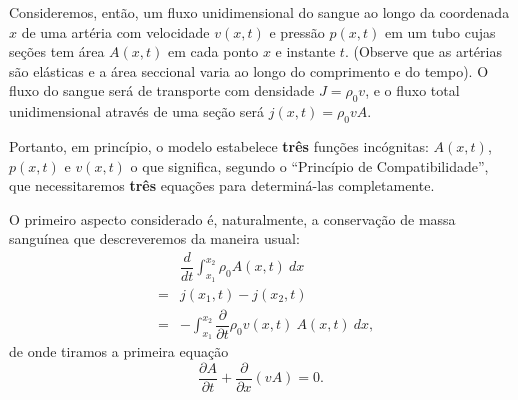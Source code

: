 Consideremos, então, um fluxo unidimensional do sangue ao longo da coordenada \(x\) de uma artéria com velocidade \(v(x,t)\) e pressão \(p(x,t)\) em um tubo cujas seções tem área \(A(x,t)\) em cada ponto \(x\) e instante \(t\). (Observe que as artérias são elásticas e a área seccional varia ao longo do comprimento e do tempo). O fluxo do sangue será de transporte com densidade \(J = \rho_0v\), e o fluxo total unidimensional através de uma seção será \(j(x,t) = \rho_0 v A\).

Portanto, em princípio, o modelo estabelece \textbf{três} funções incógnitas: \(A(x,t)\), \(p(x,t)\) e \(v(x,t)\) o que significa, segundo o ``Princípio de Compatibilidade'', que necessitaremos \textbf{três} equações para determiná-las completamente.

O primeiro aspecto considerado é, naturalmente, a conservação de massa sanguínea que descreveremos da maneira usual:
\begin{eqnarray}
& & \dfrac{d}{dt} \int_{x_1}^{x_2} \rho_0 A(x,t)\ dx \\
&=& j(x_1,t) - j(x_2,t) \\
&=& - \int_{x_1}^{x_2} \dfrac{\partial }{\partial t} \rho_0 v(x,t)\ A(x,t)\ dx,
\end{eqnarray}
de onde tiramos a primeira equação
\begin{equation}
\dfrac{\partial A}{\partial t} + \dfrac{\partial }{\partial x} (vA) = 0.
\end{equation}

